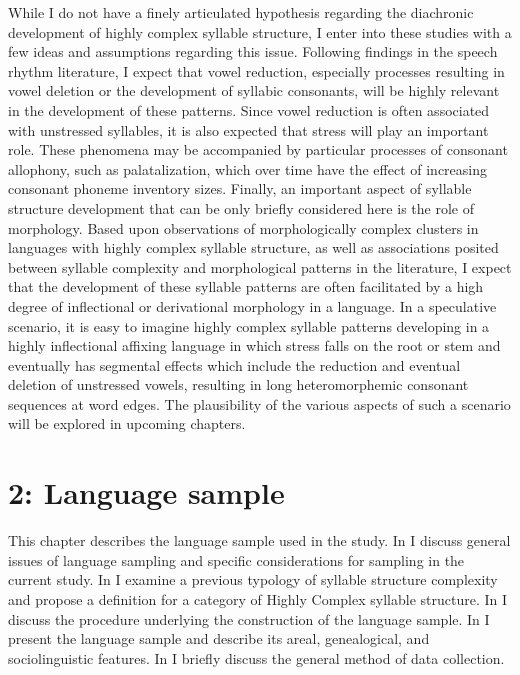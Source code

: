   While I do not have a finely articulated hypothesis regarding the diachronic development of highly complex syllable structure, I enter into these studies with a few ideas and assumptions regarding this issue. Following findings in the speech rhythm literature, I expect that vowel reduction, especially processes resulting in vowel deletion or the development of syllabic consonants, will be highly relevant in the development of these patterns. Since vowel reduction is often associated with unstressed syllables, it is also expected that stress will play an important role. These phenomena may be accompanied by particular processes of consonant allophony, such as palatalization, which over time have the effect of increasing consonant phoneme inventory sizes. Finally, an important aspect of syllable structure development that can be only briefly considered here is the role of morphology. Based upon observations of morphologically complex clusters in languages with highly complex syllable structure, as well as associations posited between syllable complexity and morphological patterns in the literature, I expect that the development of these syllable patterns are often facilitated by a high degree of inflectional or derivational morphology in a language. In a speculative scenario, it is easy to imagine highly complex syllable patterns developing in a highly inflectional affixing language in which stress falls on the root or stem and eventually has segmental effects which include the reduction and eventual deletion of unstressed vowels, resulting in long heteromorphemic consonant sequences at word edges. The plausibility of the various aspects of such a scenario will be explored in upcoming chapters.


\chapter{2: Language sample}

  This chapter describes the language sample used in the study. In  I discuss general issues of language sampling and specific considerations for sampling in the current study. In  I examine a previous typology of syllable structure complexity and propose a definition for a category of Highly Complex syllable structure. In  I discuss the procedure underlying the construction of the language sample. In  I present the language sample and describe its areal, genealogical, and sociolinguistic features. In  I briefly discuss the general method of data collection.


